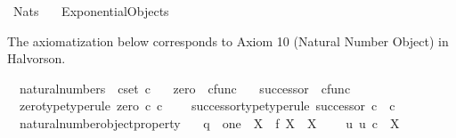 %
\begin{isabellebody}%
%
%
\isadelimtheory
%
\endisadelimtheory
%
\isatagtheory
{}\isamarkupfalse%
\ Nats\isanewline
\ \ \ Exponential{\isacharunderscore}{\kern0pt}Objects\isanewline
{}%
\endisatagtheory
{\isafoldtheory}%
%
\isadelimtheory
%
\endisadelimtheory
%
\isadelimdocument
%
\endisadelimdocument
%
\isatagdocument
%
\isamarkuptrue%
%
\endisatagdocument
{\isafolddocument}%
%
\isadelimdocument
%
\endisadelimdocument
%
\begin{isamarkuptext}%
The axiomatization below corresponds to Axiom 10 (Natural Number Object) in Halvorson.%
\end{isamarkuptext}\isamarkuptrue%
\isamarkupfalse%
\isanewline
\ \ natural{\isacharunderscore}{\kern0pt}numbers\ {\isacharcolon}{\kern0pt}{\isacharcolon}{\kern0pt}\ {\isachardoublequoteopen}cset{\isachardoublequoteclose}\ {\isacharparenleft}{\kern0pt}{\isachardoublequoteopen}{\isasymnat}\isactrlsub c{\isachardoublequoteclose}{\isacharparenright}{\kern0pt}\ \isanewline
\ \ zero\ {\isacharcolon}{\kern0pt}{\isacharcolon}{\kern0pt}\ {\isachardoublequoteopen}cfunc{\isachardoublequoteclose}\ \isanewline
\ \ successor\ {\isacharcolon}{\kern0pt}{\isacharcolon}{\kern0pt}\ {\isachardoublequoteopen}cfunc{\isachardoublequoteclose}\isanewline
\ \ \isanewline
\ \ zero{\isacharunderscore}{\kern0pt}type{\isacharbrackleft}{\kern0pt}type{\isacharunderscore}{\kern0pt}rule{\isacharbrackright}{\kern0pt}{\isacharcolon}{\kern0pt}\ {\isachardoublequoteopen}zero\ {\isasymin}\isactrlsub c\ {\isasymnat}\isactrlsub c{\isachardoublequoteclose}\ \ \isanewline
\ \ successor{\isacharunderscore}{\kern0pt}type{\isacharbrackleft}{\kern0pt}type{\isacharunderscore}{\kern0pt}rule{\isacharbrackright}{\kern0pt}{\isacharcolon}{\kern0pt}\ {\isachardoublequoteopen}successor{\isacharcolon}{\kern0pt}\ {\isasymnat}\isactrlsub c\ {\isasymrightarrow}\ {\isasymnat}\isactrlsub c{\isachardoublequoteclose}\ \ \isanewline
\ \ natural{\isacharunderscore}{\kern0pt}number{\isacharunderscore}{\kern0pt}object{\isacharunderscore}{\kern0pt}property{\isacharcolon}{\kern0pt}\ \isanewline
\ \ {\isachardoublequoteopen}q\ {\isacharcolon}{\kern0pt}\ one\ {\isasymrightarrow}\ X\ {\isasymLongrightarrow}\ f{\isacharcolon}{\kern0pt}\ X\ {\isasymrightarrow}\ X\ {\isasymLongrightarrow}\isanewline
\ \ \ {\isacharparenleft}{\kern0pt}{\isasymexists}{\isacharbang}{\kern0pt}u{\isachardot}{\kern0pt}\ u{\isacharcolon}{\kern0pt}\ {\isasymnat}\isactrlsub c\ {\isasymrightarrow}\ X\ {\isasymand}\isanewline

\end{isabellebody}
